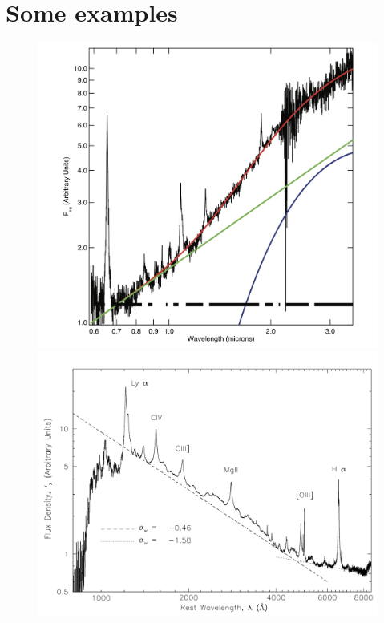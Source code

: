 \documentclass[11pt,a4paper]{article}
\begin{document}
\section{Some examples}
\begin{figure}
\begin{multicols}{2}
    \includegraphics[width=\linewidth]{Glikman_2006_ApJ_640_579_Fig7.jpeg}\par 
    \includegraphics[width=\linewidth]{Vanden_Berk_2001_AJ_122_549_Fig3.jpeg}\par 

\end{multicols}
\end{figure}
\end{document}
